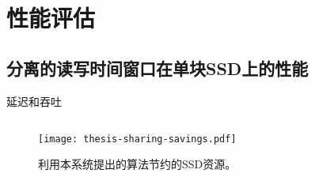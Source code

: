 
\chapter{性能评估}
\label{chap:eval}

\section{分离的读写时间窗口在单块SSD上的性能}
\label{sec:eval-iso-rw}
延迟和吞吐

\section{}

\begin{figure}[h]
  \centering
  \texttt{[image: thesis-sharing-savings.pdf]}
  \caption{
        利用本系统提出的算法节约的SSD资源。
      }
  \label{fig:eval-sharing-savings}
\end{figure}